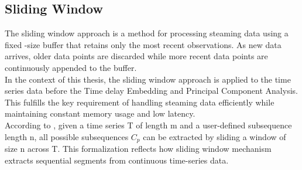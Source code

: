 \subsection{Sliding Window}
The sliding window approach is a method for processing steaming data using a fixed -size buffer that retains only the most recent observations. As new data arrives, older data points are discarded while more recent data points are continuously appended to the  buffer. \\ In the context of this thesis, the sliding window approach is applied to the time series data before the Time delay Embedding and Principal Component Analysis. This fulfills the key requirement of handling steaming data efficiently while maintaining constant memory usage  and low latency.  \\
According to \textcite[p.~14]{https://doi.org/10.1155/2014/879736}, given a time series T of length m and a user-defined subsequence length n, all possible subsequences $C_p$ can be extracted by sliding a window of size n across T.
This formalization reflects how sliding window mechanism extracts sequential segments from continuous time-series data.